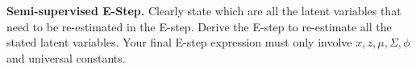 \item{} \textbf{Semi-supervised E-Step.}
Clearly state which are all the latent variables that need to be re-estimated in the E-step. Derive the E-step to re-estimate all the stated latent variables. Your final E-step expression must only involve $x, z, \mu, \Sigma, \phi$ and universal constants.

